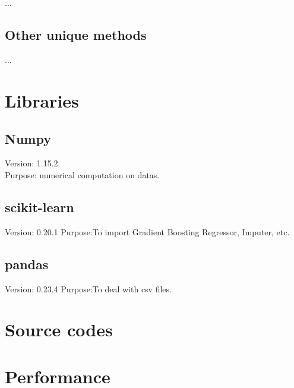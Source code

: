 \documentclass{article}
\begin{document}
\subsection{}
...

\subsection{Other unique methods}
...

\section{Libraries}
\subsection{Numpy}
\noindent
Version: 1.15.2 \\
Purpose: numerical computation on datas.

\subsection{scikit-learn}
\noindent
Version: 0.20.1
Purpose:To import Gradient Boosting Regressor, Imputer, etc.

\subsection{pandas}
\noindent
Version: 0.23.4
Purpose:To deal with csv files.

\section{Source codes}

\section{Performance}
\end{document}
